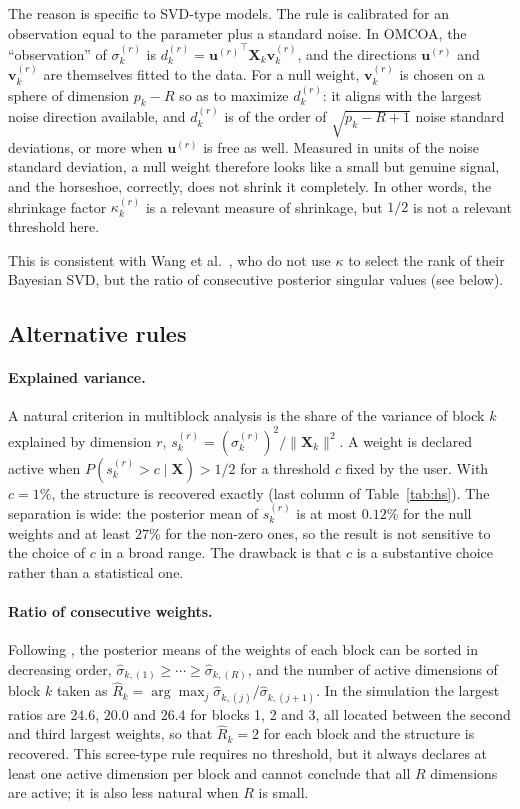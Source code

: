 \documentclass[11pt]{article}
\newcommand{\X}{\mathbf{X}}
\newcommand{\uu}{\mathbf{u}}
\newcommand{\vv}{\mathbf{v}}
\begin{document}
The reason is specific to SVD-type models. The rule is calibrated for an observation equal to the parameter plus
a standard noise. In OMCOA, the ``observation'' of $\sigma_k^{(r)}$ is $d_k^{(r)}={\uu^{(r)}}^\intercal\X_k\vv_k^{(r)}$, and the
directions $\uu^{(r)}$ and $\vv_k^{(r)}$ are themselves fitted to the data. For a null weight, $\vv_k^{(r)}$ is chosen on a
sphere of dimension $p_k-R$ so as to maximize $d_k^{(r)}$: it aligns with the largest noise direction available, and
$d_k^{(r)}$ is of the order of $\sqrt{p_k-R+1}$ noise standard deviations, or more when $\uu^{(r)}$ is free as well. Measured
in units of the noise standard deviation, a null weight therefore looks like a small but genuine signal, and the
horseshoe, correctly, does not shrink it completely. In other words, the shrinkage factor $\kappa_k^{(r)}$ is a
relevant measure of shrinkage, but $1/2$ is not a relevant threshold here.

This is consistent with Wang et al.\ \cite{wang2025}, who do not use $\kappa$ to select the rank of their Bayesian SVD,
but the ratio of consecutive posterior singular values (see below).

\subsection{Alternative rules}

\paragraph{Explained variance.} A natural criterion in multiblock analysis is the share of the variance of block $k$
explained by dimension $r$, $s_k^{(r)}=(\sigma_k^{(r)})^2/\|\X_k\|^2$. A weight is declared active when
$P(s_k^{(r)}>c\mid\X)>1/2$ for a threshold $c$ fixed by the user. With $c=1\%$, the structure is recovered exactly
(last column of Table~\ref{tab:hs}). The separation is wide: the posterior mean of $s_k^{(r)}$ is at most $0.12\%$ for the
null weights and at least $27\%$ for the non-zero ones, so the result is not sensitive to the choice of $c$ in a
broad range. The drawback is that $c$ is a substantive choice rather than a statistical one.

\paragraph{Ratio of consecutive weights.} Following \cite{wang2025}, the posterior means of the weights of each block can be
sorted in decreasing order, $\hat\sigma_{k,(1)}\geq\cdots\geq\hat\sigma_{k,(R)}$, and the number of active dimensions of block
$k$ taken as $\hat R_k=\arg\max_j\hat\sigma_{k,(j)}/\hat\sigma_{k,(j+1)}$. In the simulation the largest ratios are $24.6$,
$20.0$ and $26.4$ for blocks 1, 2 and 3, all located between the second and third largest weights, so that
$\hat R_k=2$ for each block and the structure is recovered. This scree-type rule requires no threshold, but it
always declares at least one active dimension per block and cannot conclude that all $R$ dimensions are active; it
is also less natural when $R$ is small.
\end{document}

